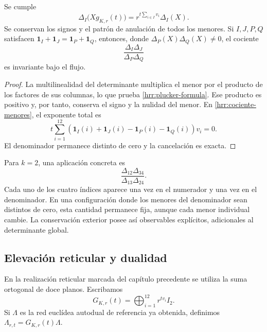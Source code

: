 \begin{proposition}
\label{hrr:plucker}
Se cumple
\begin{equation}
 \Delta_I\bigl(Xg_{K,r}(t)\bigr)
 =r^{t\sum_{i\in I}v_i}\Delta_I(X).
 \label{hrr:plucker-formula}
\end{equation}
Se conservan los signos y el patrón de anulación de todos los menores.
Si \(I,J,P,Q\) satisfacen
\(\mathbf1_I+\mathbf1_J=\mathbf1_P+\mathbf1_Q\), entonces,
donde \(\Delta_P(X)\Delta_Q(X)\neq0\), el cociente
\begin{equation}
 \frac{\Delta_I\Delta_J}{\Delta_P\Delta_Q}
 \label{hrr:cociente-menores}
\end{equation}
es invariante bajo el flujo.
\end{proposition}
\begin{proof}
La multilinealidad del determinante multiplica el menor por el producto
de los factores de sus columnas, lo que prueba
\eqref{hrr:plucker-formula}. Ese producto es positivo y, por tanto,
conserva el signo y la nulidad del menor. En
\eqref{hrr:cociente-menores}, el exponente total es
\[
 t\sum_{i=1}^{12}
 (\mathbf1_I(i)+\mathbf1_J(i)-\mathbf1_P(i)-\mathbf1_Q(i))v_i=0.
\]
El denominador permanece distinto de cero y la cancelación es exacta.
\end{proof}

Para \(k=2\), una aplicación concreta es
\[
 \frac{\Delta_{12}\Delta_{34}}{\Delta_{13}\Delta_{24}}.
\]
Cada uno de los cuatro índices aparece una vez en el numerador y una
vez en el denominador. En una configuración donde los menores del
denominador sean distintos de cero, esta cantidad permanece fija,
aunque cada menor individual cambie. La conservación exterior posee
así observables explícitos, adicionales al determinante global.

\subsection{Elevación reticular y dualidad}

En la realización reticular marcada del capítulo precedente se utiliza
la suma ortogonal de doce planos. Escribamos
\[
 G_{K,r}(t)=\bigoplus_{i=1}^{12}r^{tv_i}I_2.
\]
Si \(\Lambda\) es la red euclídea autodual de referencia ya obtenida,
definimos \(\Lambda_{r,t}=G_{K,r}(t)\Lambda\).

